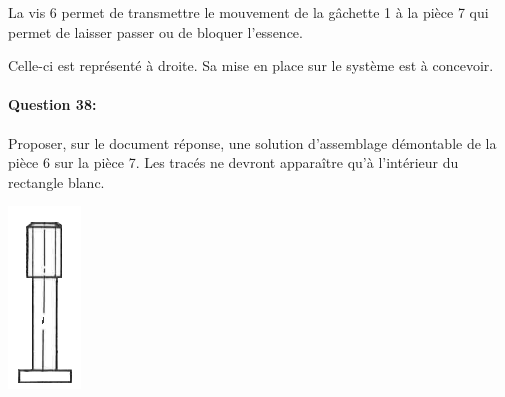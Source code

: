 \begin{minipage}{0.7\linewidth}
La vis 6 permet de transmettre le mouvement de la gâchette 1 à la pièce 7 qui permet de laisser passer ou de bloquer l'essence.

Celle-ci est représenté à droite. Sa mise en place sur le système est à concevoir.

\paragraph{Question 38:} Proposer, sur le document réponse, une solution d'assemblage démontable de la pièce 6 sur la pièce 7. Les tracés ne devront apparaître qu'à l'intérieur du rectangle blanc.
\end{minipage}\hfill
\begin{minipage}{0.25\linewidth}
 \includegraphics[width=0.5\linewidth]{img/vis}
\end{minipage}



\cleardoublepage

